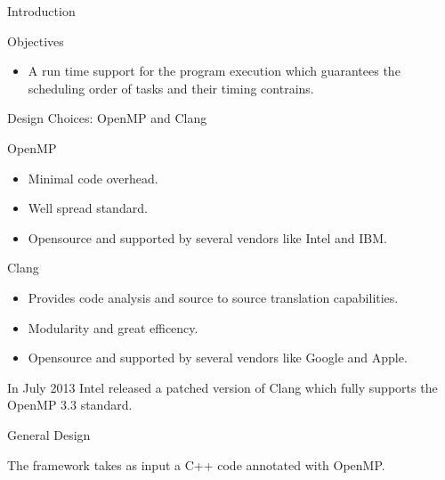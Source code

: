 \documentclass[xcolor=dvipsnames]{beamer}
\begin{document}
\begin{section}{Introduction}
\begin{frame}{\hskip 0.3cm Objectives}
\begin{itemize}
\item A run time support for the program execution which guarantees the scheduling order of tasks and their timing contrains.

\end{itemize}



\end{frame}











\begin{frame}{\hskip 0.3cm Design Choices: OpenMP and Clang}


OpenMP 

\begin{itemize}

\item Minimal code overhead.

\item Well spread standard.

\item Opensource and supported by several vendors like Intel and IBM.

\end{itemize}

Clang

\begin{itemize}

\item Provides code analysis and source to source translation capabilities.

\item Modularity and great efficency.

\item Opensource and supported by several vendors like Google and Apple.

\end{itemize}
In July 2013 Intel released a patched version of Clang which fully supports the OpenMP 3.3 standard. 

\end{frame}











\begin{frame}{\hskip 0.3cm General Design}

The framework takes as input a C++ code annotated with OpenMP.


\end{frame}
\end{section}
\end{document}
